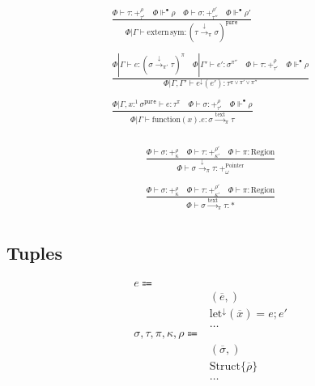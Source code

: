 \documentclass {article}
\begin{document}
\begin{gather*}
\frac
{\Phi \vdash \tau : +^\rho_{\tau'} \quad \Phi \Vdash^\bullet \rho
\quad \Phi \vdash \sigma : +^{\rho'}_{\tau''} \quad \Phi \Vdash^\bullet \rho'}
{\Phi | \Gamma \vdash \text{extern} \, \text{sym} : (\tau \xrightarrow{\downarrow}_{\pi} \sigma)^\texttt{pure}} \\
\\
\frac
{\Phi | \Gamma \vdash e : (\sigma \xrightarrow{\downarrow}_{\pi'} \tau)^\pi \quad
\Phi | \Gamma' \vdash e' : \sigma^{\pi''} \quad
\Phi \vdash \tau : +^\rho_{\tau'} \quad \Phi \Vdash^\bullet \rho}
{\Phi | \Gamma, \Gamma' \vdash e^\downarrow (e') : \tau^{\pi \lor \pi' \lor \pi''}} \\
\\
\frac
{\Phi | \Gamma, x :^1 \sigma^\texttt{pure} \vdash e : \tau^\pi
\quad \Phi \vdash \sigma : +^\rho_{\tau'}
\quad \Phi \Vdash^\bullet \rho}
{\Phi | \Gamma \vdash \text{function}(x). e : \sigma \xrightarrow{\text{text}}_\pi \tau} \\
\end{gather*}

\begin{gather*}
\frac
{\Phi \vdash \sigma : +^{\rho}_{\kappa} \quad \Phi \vdash \tau : +^{\rho'}_{\kappa'} \quad \Phi \vdash \pi : \text{Region}}
{\Phi \vdash \sigma \xrightarrow{\downarrow}_\pi \tau : +^\text{Pointer}_\omega} \\
\\
\frac
{\Phi \vdash \sigma : +^{\rho}_{\kappa} \quad \Phi \vdash \tau : +^{\rho'}_{\kappa'} \quad \Phi \vdash \pi : \text{Region}}
{\Phi \vdash \sigma \xrightarrow{\text{text}}_\pi \tau : *} \\
\end{gather*}

\subsection{Tuples}
\begin{align*}
e \Coloneqq & \\
& (\overline e,) \tag{Tuple Introduction} \\
& \text{let}^\downarrow (\overline x) = e; e' \tag{Tuple Elimination} \\
& \dots \\
\sigma, \tau, \pi, \kappa, \rho \Coloneqq & \\
& (\overline \sigma,) \tag{Tuple} \\
& \text{Struct} \{ \overline \rho \} \tag{Struct Representation} \\
& \dots
\end{align*}
\end{document}

